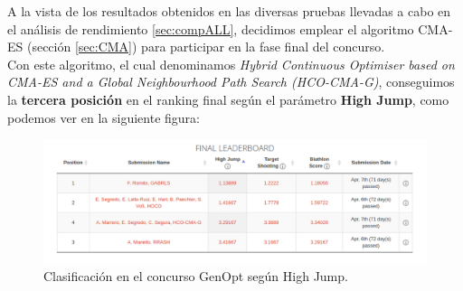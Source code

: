A la vista de los resultados obtenidos en las diversas pruebas llevadas a cabo en el análisis de rendimiento \ref{sec:compALL}, decidimos emplear el algoritmo CMA-ES (sección \ref{sec:CMA}) para participar en la fase final del concurso. \\
Con este algoritmo, el cual denominamos \textit{Hybrid Continuous Optimiser based on CMA-ES and a Global Neighbourhood Path Search (HCO-CMA-G)}, conseguimos la \textbf{tercera posición} en el ranking final según el parámetro \textbf{High Jump}, como podemos ver en la siguiente figura: 

\begin{figure}[!ht]
  \centering
	\includegraphics[scale=0.5]{images/final}
  \caption{Clasificación en el concurso GenOpt según High Jump.}
\end{figure}

